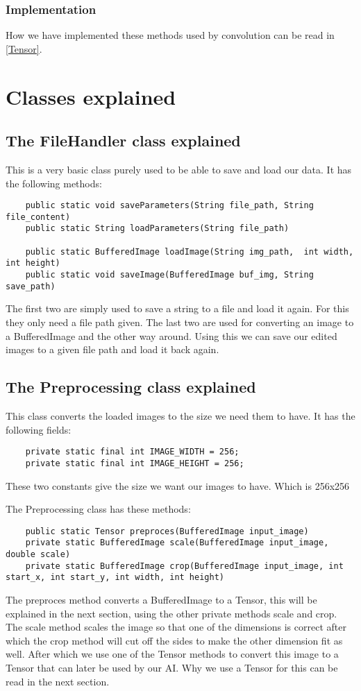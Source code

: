 \documentclass[12pt, titlepage]{article}
\let\oldsection\section
\renewcommand\section{\clearpage\oldsection}
\begin{document}
    \subsubsection{Implementation}
    How we have implemented these methods used by convolution can be read in \ref{Tensor}.
    
    
    \section{Classes explained}
    \subsection{The FileHandler class explained}
    This is a very basic class purely used to be able to save and load our data. It has the following methods:
    \begin{lstlisting}
    public static void saveParameters(String file_path, String file_content)     
    public static String loadParameters(String file_path)
    
    public static BufferedImage loadImage(String img_path,  int width, int height)
    public static void saveImage(BufferedImage buf_img, String save_path)
    \end{lstlisting}
    The first two are simply used to save a string to a file and load it again. For this they only need a file path given. The last two are used for converting an image to a BufferedImage and the other way around. Using this we can save our edited images to a given file path and load it back again.
    
    \subsection{The Preprocessing class explained}
    This class converts the loaded images to the size we need them to have.
    It has the following fields:
    \begin{lstlisting}
    private static final int IMAGE_WIDTH = 256;
    private static final int IMAGE_HEIGHT = 256;
    \end{lstlisting}
    These two constants give the size we want our images to have. Which is 256x256
    
    The Preprocessing class has these methods:
    \begin{lstlisting}
    public static Tensor preproces(BufferedImage input_image)
    private static BufferedImage scale(BufferedImage input_image, double scale)
    private static BufferedImage crop(BufferedImage input_image, int start_x, int start_y, int width, int height)
    \end{lstlisting}
    The preproces method converts a BufferedImage to a Tensor, this will be explained in the next section, using the other private methods scale and crop.
    The scale method scales the image so that one of the dimensions is correct after which the crop method will cut off the sides to make the other dimension fit as well. After which we use one of the Tensor methods to convert this image to a Tensor that can later be used by our AI. Why we use a Tensor for this can be read in the next section.
    
\end{document}
